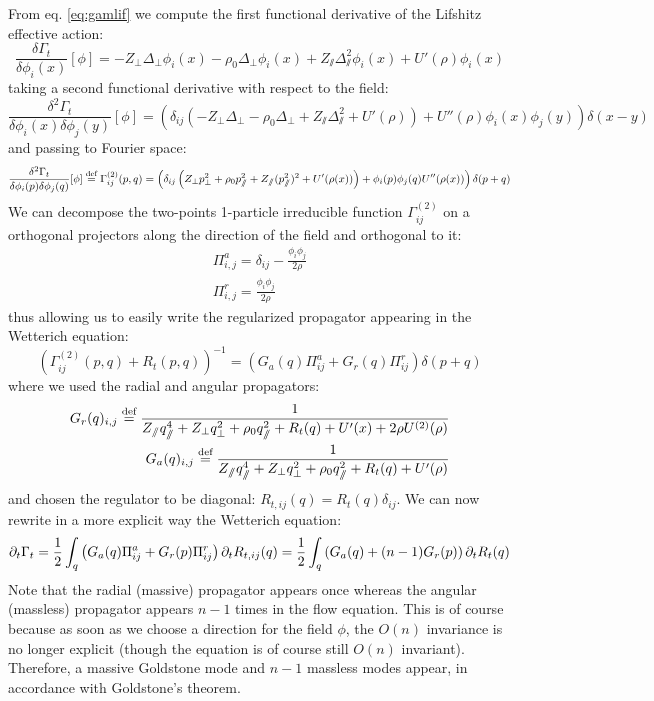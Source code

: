 From eq. \ref{eq:gamlif} we compute the first functional derivative of the Lifshitz effective action:
\begin{equation}
\frac{\delta \Gamma_t}{\delta \phi_i(x)}[\phi] = - Z_\perp \Delta_\perp \phi_i(x) - \rho_0 \Delta_\perp \phi_i(x) + Z_\sslash \Delta_\sslash^2 \phi_i(x) + U'(\rho) \phi_i(x)
\end{equation}
taking a second functional derivative with respect to the field:
\begin{equation}
\frac{\delta^2 \Gamma_t}{\delta \phi_i(x) \delta \phi_j(y)}[\phi] =\left(   \delta_{ij} \left( - Z_\perp \Delta_\perp - \rho_0 \Delta_\perp + Z_\sslash \Delta_\sslash^2  + U'(\rho) \right) + U''(\rho) \phi_i(x) \phi_j(y) \right) \delta(x-y)
\end{equation}
and passing to Fourier space:
\begin{equation}
\frac{\delta^2 \Gamma_t}{\delta \phi_i(p) \delta \phi_j(q)}[\phi]  \overset{\text{def}}{=}  \Gamma^{(2)}_{ij}(p,q) = 
\left( \delta_{ij} \left(Z_\perp p_{\perp}^2 +\rho_0 p_{\sslash}^2 +Z_\sslash (p_\sslash^2)^2 + U'(\rho (x))\right)+\phi_i(p) \phi_j(q) U''(\rho (x)) \right) \delta(p+q)
\end{equation}
We can decompose the two-points 1-particle irreducible function $\Gamma^{(2)}_{ij}$ on a orthogonal projectors along the direction of the field and orthogonal to it:
\begin{align}
\Pi^a_{i,j} = \delta_{ij} - \frac{\phi_i \phi_j}{2 \rho} \\
\Pi^r_{i,j} = \frac{\phi_i \phi_j}{2 \rho}
\end{align}
thus allowing us to easily write the regularized propagator appearing in the Wetterich equation:
\begin{equation}
\left( \Gamma^{(2)}_{ij}(p,q) + R_t(p,q) \right)^{-1} = \left( G_a(q) \Pi^a_{ij} + G_r(q) \Pi^r_{ij} \right) \delta(p+q)
\end{equation}
where we used the radial and angular propagators:
\begin{align}
G_r(q)_{i,j}  \overset{\text{def}}{=}  \frac{1}{Z_\sslash q_\sslash^4 + Z_\perp q_\perp^2 + \rho_0 q_\sslash^2 + R_t(q)  + U'(x) + 2 \rho U^{(2)}(\rho)} \\
G_a(q)_{i,j}  \overset{\text{def}}{=}  \frac{1}{Z_\sslash q_\sslash^4 + Z_\perp q_\perp^2 + \rho_0 q_\sslash^2 + R_t(q) + U'(\rho)}
\end{align}
and chosen the regulator to be diagonal:  $R_{t,ij}(q) = R_t(q) \delta_{ij}$.
We can now rewrite in a more explicit way the Wetterich equation:
\begin{equation}
\partial_{t} \Gamma_t = \frac{1}{2} \int_q \left(  G_a(q) \Pi^a_{ij} + G_r(p) \Pi^r_{ij} \right) \partial_{t} R_{t,ij}(q)  = \frac{1}{2} \int_q \left(  G_a(q) + (n-1)G_r(p) \right) \partial_{t} R_{t}(q) 
\end{equation}
Note that the radial (massive) propagator appears once whereas the angular (massless) propagator appears $n-1$ times in the flow equation. This is of course because as soon as we choose a direction for the field $\phi$, the  $O(n)$ invariance is no longer explicit (though the equation is of course still $O(n)$ invariant). Therefore, a massive Goldstone mode and $n-1$ massless modes appear, in accordance with Goldstone's theorem.


